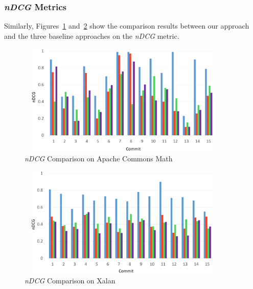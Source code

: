 






\subsubsection{\textit{nDCG} Metrics}

Similarly, Figures~\ref{fig:common-math-dcg} and~\ref{fig:xalan-dcg} show the comparison results between our approach and the three baseline approaches on the \textit{nDCG} metric. 

\begin{figure}
\centering
		\includegraphics[width=4in, height=2.1in]{performance/images/common-math-dcg.pdf}
			
		\caption{\textit{nDCG} Comparison on Apache Commons Math}	
		\label{fig:common-math-dcg}
\end{figure}

\begin{figure}
\centering
		
		\includegraphics[width=4in, height=2.1in]{performance/images/xalan-dcg.pdf}
			
		\caption{\textit{nDCG} Comparison on Xalan}	
		\label{fig:xalan-dcg}
\end{figure}


